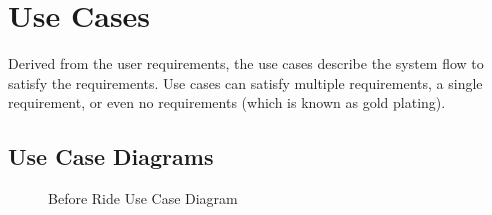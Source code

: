\normalsize
\section{Use Cases}
Derived from the user requirements, the use cases describe the system flow to satisfy the requirements. Use cases can satisfy multiple requirements, a single requirement, or even no requirements (which is known as gold plating).

\subsection{Use Case Diagrams}

\begin{figure}[H]
\centering
{}
\caption{\label{Figure::UCDiagram::BeforeRiding} Before Ride Use Case  Diagram}
\end{figure}

